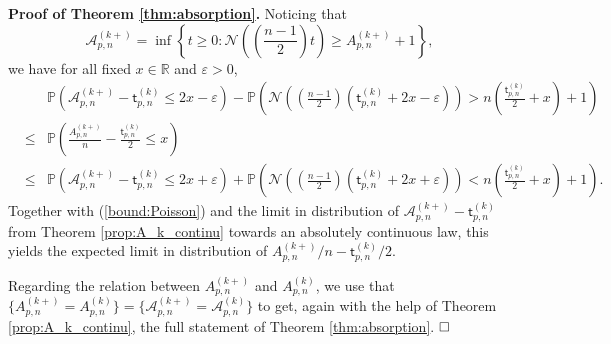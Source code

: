 \documentclass[a4, 11pt]{article}
\numberwithin{equation}{section}
\theoremstyle{plain}
\theoremstyle{definition}
\theoremstyle{remark}
\begin{document}
\bigskip

\textbf{Proof of Theorem \ref{thm:absorption}.} Noticing that
$$
\mathcal A_{p,n}^{(k+)}=\inf \left\{t\geq 0:\mathcal N\left(\left(\frac{n-1}{2}\right)t\right) \geq A_{p,n}^{(k+)}+1 \right\},
$$
we have for all fixed $x \in \mathbb R$ and $\varepsilon>0$,
\begin{eqnarray*}
&& \mathbb P\left( \mathcal A_{p,n}^{(k+)} - \mathsf t^{(k)}_{p,n} \leq 2x-\varepsilon\right) -\mathbb P\left(\mathcal N\left(\left(\frac{n-1}{2}\right)\left(\mathsf t^{(k)}_{p,n}+2x-\varepsilon \right) \right) > n \left(\frac{\mathsf t^{(k)}_{p,n}}{2}+x \right)+1\right)\\
&\leq& \mathbb P\left(\frac{A_{p,n}^{(k+)}}{n} -\frac{\mathsf t^{(k)}_{p,n}}{2} \leq x\right) \\
&\leq& \mathbb P\left(\mathcal A_{p,n}^{(k+)} - \mathsf t^{(k)}_{p,n}\leq 2x+\varepsilon \right)+ \mathbb P\left(\mathcal N\left(\left(\frac{n-1}{2}\right)\left(\mathsf t^{(k)}_{p,n}+2x+\varepsilon \right) \right) < n \left(\frac{\mathsf t^{(k)}_{p,n}}{2}+x \right)+1\right).
\end{eqnarray*}
Together with (\ref{bound:Poisson}) and the limit in distribution of  $\mathcal A_{p,n}^{(k+)} - \mathsf t^{(k)}_{p,n}$ from Theorem \ref{prop:A_k_continu} towards an absolutely continuous law, this yields the expected limit in distribution of ${A_{p,n}^{(k+)}}/{n} -{\mathsf t^{(k)}_{p,n}}/{2}$.

Regarding the relation between $A_{p,n}^{(k+)}$ and $A_{p,n}^{(k)}$, we use that $\big\{A_{p,n}^{(k+)}=A_{p,n}^{(k)}\big\}=\big\{\mathcal A_{p,n}^{(k+)}=\mathcal A_{p,n}^{(k)}\big\}$ to get, again with the help of Theorem \ref{prop:A_k_continu}, the full statement of Theorem \ref{thm:absorption}. 
$\hfill \square$

\bigskip
\end{document}
